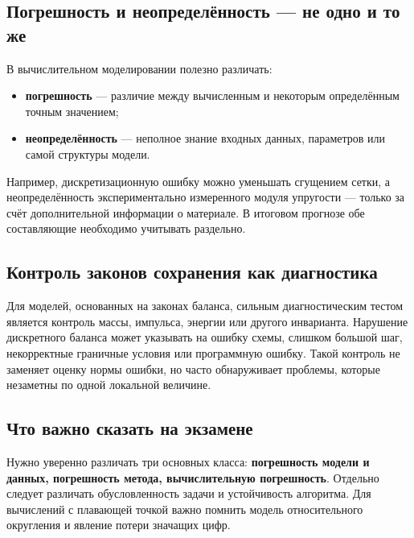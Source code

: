 \subsection{Погрешность и неопределённость --- не одно и то же}

В вычислительном моделировании полезно различать:
\begin{itemize}
    \item \textbf{погрешность} --- различие между вычисленным и некоторым
    определённым точным значением;
    \item \textbf{неопределённость} --- неполное знание входных данных,
    параметров или самой структуры модели.
\end{itemize}
Например, дискретизационную ошибку можно уменьшать сгущением сетки, а
неопределённость экспериментально измеренного модуля упругости --- только за счёт
дополнительной информации о материале. В итоговом прогнозе обе составляющие
необходимо учитывать раздельно.

\subsection{Контроль законов сохранения как диагностика}

Для моделей, основанных на законах баланса, сильным диагностическим тестом
является контроль массы, импульса, энергии или другого инварианта. Нарушение
дискретного баланса может указывать на ошибку схемы, слишком большой шаг,
некорректные граничные условия или программную ошибку. Такой контроль не заменяет
оценку нормы ошибки, но часто обнаруживает проблемы, которые незаметны по одной
локальной величине.

\subsection{Что важно сказать на экзамене}

Нужно уверенно различать три основных класса: \textbf{погрешность модели и
данных, погрешность метода, вычислительную погрешность}. Отдельно следует
различать обусловленность задачи и устойчивость алгоритма. Для вычислений
с плавающей точкой важно помнить модель относительного округления и
явление потери значащих цифр.

\newpage

